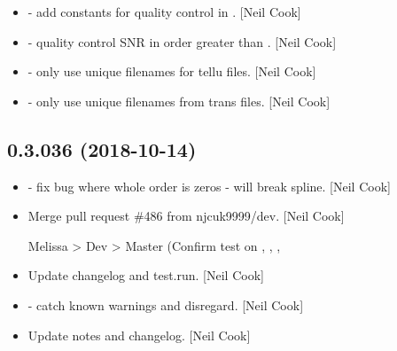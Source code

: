 \documentclass[a4paper,10pt,english]{report}
\begin{document}
\begin{itemize}
\item {} 
 - add constants for quality control in
. {[}Neil Cook{]}

\item {} 
 - quality control SNR in order 
greater than . {[}Neil Cook{]}

\item {} 
 - only use unique filenames for tellu files. {[}Neil
Cook{]}

\item {} 
 - only use unique filenames from trans files. {[}Neil
Cook{]}

\end{itemize}


\subsection{0.3.036 (2018-10-14)}
\label{\detokenize{misc/changelog:id295}}\begin{itemize}
\item {} 
  - fix bug where whole order is zeros - will break
spline. {[}Neil Cook{]}

\item {} 
Merge pull request \#486 from njcuk9999/dev. {[}Neil Cook{]}

Melissa \textendash{}\textgreater{} Dev \textendash{}\textgreater{} Master (Confirm test on , , , 

\item {} 
Update changelog and test.run. {[}Neil Cook{]}

\item {} 
 - catch known warnings and disregard. {[}Neil Cook{]}

\item {} 
Update notes and changelog. {[}Neil Cook{]}

\end{itemize}
\end{document}
